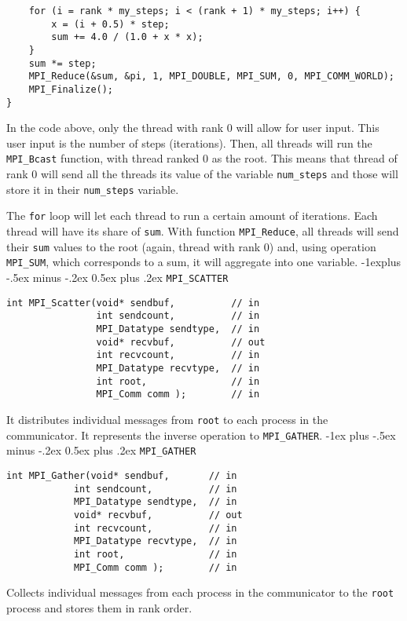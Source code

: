 \documentclass[10pt,landscape]{article}
\makeatletter
\renewcommand{\section}{\@startsection{section}{1}{0mm}%
                                {-1ex plus -.5ex minus -.2ex}%
                                {0.5ex plus .2ex}%
                                {\normalfont\large\bfseries}}
\renewcommand{\subsection}{\@startsection{subsection}{2}{0mm}%
                                {-1explus -.5ex minus -.2ex}%
                                {0.5ex plus .2ex}%
                                {\normalfont\normalsize\bfseries}}
\makeatother
\begin{document}
\begin{multicols}{3}
\begin{verbatim}
    for (i = rank * my_steps; i < (rank + 1) * my_steps; i++) {
        x = (i + 0.5) * step;
        sum += 4.0 / (1.0 + x * x);
    }
    sum *= step;
    MPI_Reduce(&sum, &pi, 1, MPI_DOUBLE, MPI_SUM, 0, MPI_COMM_WORLD);
    MPI_Finalize();
}
\end{verbatim}
\par
In the code above, only the thread with rank 0 will allow for user input. This user input is the number of steps (iterations). Then, all threads will run the \texttt{MPI\_Bcast} function, with thread ranked 0 as the root. This means that thread of rank 0 will send all the threads its value of the variable \texttt{num\_steps} and those will store it in their \texttt{num\_steps} variable.
\par
The \texttt{for} loop will let each thread to run a certain amount of iterations. Each thread will have its share of \texttt{sum}. With function \texttt{MPI\_Reduce}, all threads will send their \texttt{sum} values to the root (again, thread with rank 0) and, using operation \texttt{MPI\_SUM}, which corresponds to a sum, it will aggregate into one variable.
\subsection{\texttt{MPI\_SCATTER}}
\begin{verbatim}
int MPI_Scatter(void* sendbuf,          // in
                int sendcount,          // in
                MPI_Datatype sendtype,  // in
                void* recvbuf,          // out
                int recvcount,          // in
                MPI_Datatype recvtype,  // in
                int root,               // in
                MPI_Comm comm );        // in
\end{verbatim}
\par
It distributes individual messages from \texttt{root} to each process in the communicator. It represents the inverse operation to \texttt{MPI\_GATHER}.
\section{\texttt{MPI\_GATHER}}
\begin{verbatim}
int MPI_Gather(void* sendbuf,       // in
            int sendcount,          // in
            MPI_Datatype sendtype,  // in
            void* recvbuf,          // out
            int recvcount,          // in
            MPI_Datatype recvtype,  // in
            int root,               // in
            MPI_Comm comm );        // in
\end{verbatim}
\par
Collects individual messages from each process in the communicator to the \texttt{root} process and stores them in rank order.

\end{multicols}
\end{document}
